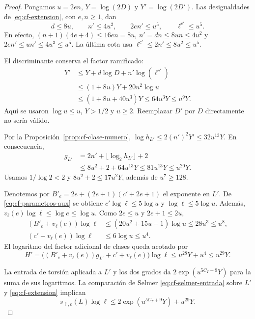 \begin{proof}
Pongamos $u=2en$, $Y=\log(2D)$ y $Y'=\log(2D')$.
Las desigualdades de \eqref{eq:cf-extension}, con $e,n\ge1$, dan
\begin{equation}
 d\le8u,\qquad n'\le4u^2,\qquad
 2en'\le u^5,\qquad \ell^{c'}\le u^5.
 \label{eq:cf-parametros-aux}
\end{equation}
En efecto, $(n+1)(4e+4)\le16en=8u$,
$n'=dn\le8un\le4u^2$ y
$2en'\le un'\le4u^3\le u^5$.
La última cota usa $\ell^{c'}\le2n'\le8u^2\le u^5$.

El discriminante conserva el factor ramificado:
\[
 \begin{aligned}
 Y'&\le Y+d\log D+n'\log(\ell^{c'})\\
   &\le(1+8u)Y+20u^2\log u\\
   &\le(1+8u+40u^3)Y
    \le64u^3Y\le u^9Y.
 \end{aligned}
\]
Aquí se usaron $\log u\le u$, $Y>1/2$ y $u\ge2$.
Reemplazar $D'$ por $D$ directamente no sería válido.

Por la Proposición~\ref{prop:cf-clase-numero},
$\log h_{L'}\le2(n')^2Y'\le32u^{13}Y$. En consecuencia,
\begin{equation}
 \begin{aligned}
 g_{L'}&=2n'+\lfloor\log_2h_{L'}\rfloor+2\\
 &\le8u^2+2+64u^{13}Y
 \le81u^{13}Y\le u^{20}Y.
 \end{aligned}
 \label{eq:cf-generadores}
\end{equation}
Usamos $1/\log2<2$ y
$8u^2+2\le17u^2Y$, además de $u^7\ge128$.

Denotemos por $B'_e=2e+(2e+1)(c'+2e+1)$ el exponente en $L'$.
De \eqref{eq:cf-parametros-aux} se obtiene
$c'\log\ell\le5\log u$ y $\log\ell\le5\log u$.
Además, $v_\ell(e)\log\ell\le\log e\le\log u$.
Como $2e\le u$ y $2e+1\le2u$,
\[
 \begin{aligned}
 (B'_e+v_\ell(e))\log\ell
 &\le(20u^2+15u+1)\log u
 \le28u^3\le u^8,\\
 (c'+v_\ell(e))\log\ell&\le6\log u\le u^4.
 \end{aligned}
\]
El logaritmo del factor adicional de clases queda acotado por
\begin{equation}
 H'=\bigl((B'_e+v_\ell(e))g_{L'}+c'+v_\ell(e)\bigr)\log\ell
 \le u^{28}Y+u^4\le u^{29}Y.
 \label{eq:cf-resto-clases}
\end{equation}

La entrada de torsión aplicada a $L'$ y los dos grados da
$2\exp(u^{5C_T+9}Y)$ para la suma de sus logaritmos.
La comparación de Selmer \eqref{eq:cf-selmer-entrada} sobre $L'$
y \eqref{eq:cf-extension} implican
\begin{equation}
 s_{\ell,e}(L)\log\ell
 \le2\exp(u^{5C_T+9}Y)+u^{29}Y.
 \label{eq:cf-cota-sha}
\end{equation}


\end{proof}
